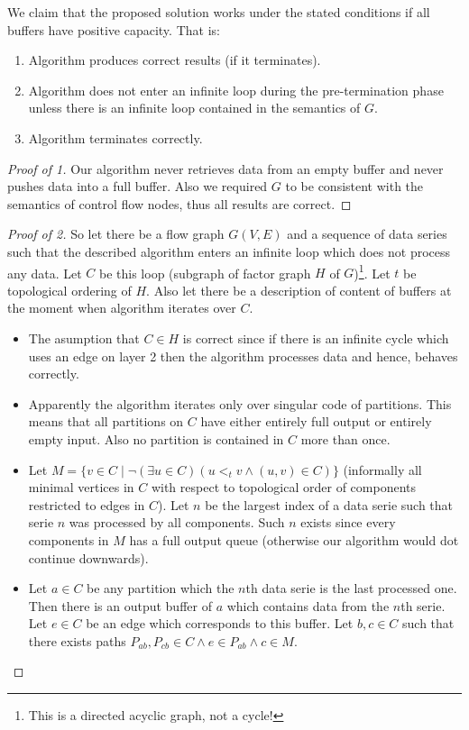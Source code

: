 \begin{claim}
We claim that the proposed solution works under the stated conditions if all buffers have positive capacity. That is:
\begin{enumerate}
  \item Algorithm produces correct results (if it terminates).
  \item Algorithm does not enter an infinite loop during the pre-termination phase unless there is an infinite loop contained in the semantics of $G$.
  \item Algorithm terminates correctly.
\end{enumerate}
\begin{proof}[Proof of 1]
  Our algorithm never retrieves data from an empty buffer and never pushes data into a full buffer. Also we required $G$ to be consistent with the semantics of control flow nodes, thus all results are correct. 
\end{proof}
\begin{proof}[Proof of 2] So let there be a flow graph $G(V,E)$ and a sequence of data series such that the described algorithm enters an infinite loop which does not process any data. Let $C$ be this loop (subgraph of factor graph $H$ of $G$)\footnote{This is a directed acyclic graph, not a cycle!}. Let $t$ be topological ordering of $H$. Also let there be a description of content of buffers at the moment when algorithm iterates over $C$.
  \begin{itemize}
    \item The asumption that $C \in H$ is correct since if there is an infinite cycle which uses an edge on layer 2 then the algorithm processes data and hence, behaves correctly.
    \item Apparently the algorithm iterates only over singular code of partitions. This means that all partitions on $C$ have either entirely full output or entirely empty input. Also no partition is contained in $C$ more than once.
    \item Let $M = \{v \in C \mid \neg (\exists u \in C)( u <_t v \wedge (u,v) \in C )\}$ (informally all minimal vertices in $C$ with respect to topological order of components restricted to edges in $C$). Let $n$ be the largest index of a data serie such that serie $n$ was processed by all components. Such $n$ exists since every components in $M$ has a full output queue (otherwise our algorithm would dot continue downwards).

    \item Let $a \in C$ be any partition which the $n$th data serie is the last processed one. Then there is an output buffer of $a$ which contains data from the $n$th serie. Let $e \in C$ be an edge which corresponds to this buffer.  Let $b,c \in C$ such that there exists paths $P_{ab}, P_{cb} \in C \wedge e \in P_{ab} \wedge c \in M$. 


\end{itemize}
\end{proof}
\end{claim}
